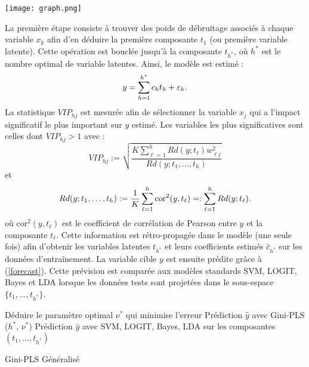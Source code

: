 \begin{center}
	\texttt{[image: graph.png]}
\end{center}


La première étape consiste à trouver des poids de débruitage associés à chaque variable $x_k$ afin d'en déduire la première composante $t_1$ (ou première variable latente). Cette opération est bouclée jusqu'à la composante $t_{h^*}$, où $h^*$ est le nombre optimal de variable latentes. Ainsi, le modèle est estimé :
\begin{equation}\label{forecast}
y=\sum_{h=1}^{h^*} c_ht_h +\varepsilon_h.
\end{equation}   
La statistique $VIP_{hj}$ est mesurée afin de sélectionner la variable $x_j$ qui a l'impact significatif le plus important sur $y$ estimé. Les variables les plus significatives sont celles dont $VIP_{hj}>1$ avec :
\[
VIP_{hj} := \sqrt{\frac{K\sum_{\ell=1}^{h}Rd(y;t_\ell)w_{\ell j}^2}{Rd(y;t_1,\ldots,t_h)}} 
\] 
et 
\[
Rd(y; t_1,\ldots,t_h) := \frac{1}{K}\sum_{\ell=1}^{h}\text{cor}^2(y,t_\ell) =: \sum_{\ell=1}^{h}Rd(y;t_\ell).
\]
où $\text{cor}^2(y,t_\ell)$ est le coefficient de corrélation de Pearson entre $y$ et la composante $t_\ell$. Cette information est rétro-propagée dans le modèle (une seule fois) afin d'obtenir les variables latentes $t_{h^*}$ et leurs coefficients estimés $\hat{c}_{h^*}$ sur les données d'entraînement. La variable cible $y$ est ensuite prédite grâce à (\ref{forecast}). Cette prévision est comparée aux modèles standards SVM, LOGIT, Bayes et LDA lorsque les données tests sont projetées dans le sous-espace $\{t_1,\ldots,t_{h^*}\}$.


\begin{algorithm}[h]
	\small
	Déduire le paramètre optimal $\nu^*$ qui minimise l'erreur \; 
	\Return Prédiction $\hat{y}$ avec Gini-PLS ($h^*$, $\nu^*$) \;
	\Return Prédiction $\hat{y}$ avec SVM, LOGIT, Bayes, LDA sur les composantes $(t_1,\ldots,t_{h^*})$\;
	\caption{Gini-PLS Généralisé}\label{G-GPLS}
\end{algorithm}
\bigskip

